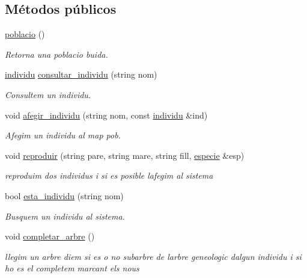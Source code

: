 \subsection*{Métodos públicos}
\begin{DoxyCompactItemize}
\item 
\hyperlink{classpoblacio_a8d6ad7ce285dd47c9cfd806e302d7086}{poblacio} ()
\begin{DoxyCompactList}\small\item\em Retorna una poblacio buida. \end{DoxyCompactList}\item 
\hyperlink{classindividu}{individu} \hyperlink{classpoblacio_a30ec7988306978a608ab11062069e6e1}{consultar\+\_\+individu} (string nom)
\begin{DoxyCompactList}\small\item\em Consultem un individu. \end{DoxyCompactList}\item 
void \hyperlink{classpoblacio_a09a516141a9a8bef9249239916894af5}{afegir\+\_\+individu} (string nom, const \hyperlink{classindividu}{individu} \&ind)
\begin{DoxyCompactList}\small\item\em Afegim un individu al map pob. \end{DoxyCompactList}\item 
void \hyperlink{classpoblacio_a347bc063088e161813c257211d8059b9}{reproduir} (string pare, string mare, string fill, \hyperlink{classespecie}{especie} \&esp)
\begin{DoxyCompactList}\small\item\em reproduim dos individus i si es posible l\textquotesingle{}afegim al sistema \end{DoxyCompactList}\item 
bool \hyperlink{classpoblacio_a9c6fe58f2cbd06574070df2ef4076015}{esta\+\_\+individu} (string nom)
\begin{DoxyCompactList}\small\item\em Busquem un individu al sistema. \end{DoxyCompactList}\item 
void \hyperlink{classpoblacio_a1e30be9019dcb194171228c41284117f}{completar\+\_\+arbre} ()
\begin{DoxyCompactList}\small\item\em llegim un arbre diem si es o no subarbre de l\textquotesingle{}arbre geneologic d\textquotesingle{}algun individu i si ho es el completem marcant els nous \end{DoxyCompactList}\item 

\end{DoxyCompactItemize}
